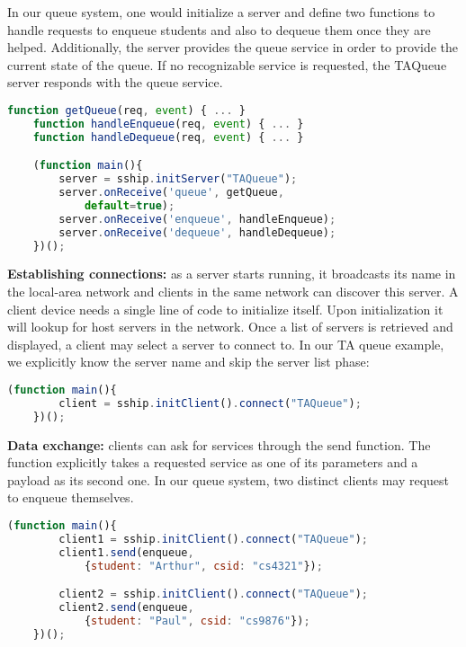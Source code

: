 In our queue system, one would initialize a server and define two functions to handle requests to enqueue students and also to dequeue them once they are helped. Additionally, the server provides the queue service in order to provide the current state of the queue. If no recognizable service is requested, the TAQueue server responds with the queue service.

\begin{lstlisting}[language=JavaScript]
    function getQueue(req, event) { ... }
    function handleEnqueue(req, event) { ... }
    function handleDequeue(req, event) { ... }

    (function main(){
        server = sship.initServer("TAQueue");
        server.onReceive('queue', getQueue, 
            default=true);
        server.onReceive('enqueue', handleEnqueue);
        server.onReceive('dequeue', handleDequeue);
    })();
\end{lstlisting}

{\bf Establishing connections: } as a server starts running, it broadcasts its name in the local-area network and clients in the same network can discover this server. A client device needs a single line of code to initialize itself. Upon initialization it will lookup for host servers in the network. Once a list of servers is retrieved and displayed, a client may select a server to connect to. In our TA queue example, we explicitly know the server name and skip the server list phase:

\begin{lstlisting}[language=JavaScript]
    (function main(){
        client = sship.initClient().connect("TAQueue");
    })();
\end{lstlisting}


{\bf Data exchange: } clients can ask for services through the {\ttfamily send} function. The function explicitly takes a requested service as one of its parameters and a payload as its second one. In our queue system, two distinct clients may request to enqueue themselves.

\begin{lstlisting}[language=JavaScript]
    (function main(){
        client1 = sship.initClient().connect("TAQueue");
        client1.send(enqueue, 
            {student: "Arthur", csid: "cs4321"});

        client2 = sship.initClient().connect("TAQueue");
        client2.send(enqueue, 
            {student: "Paul", csid: "cs9876"});
    })();
\end{lstlisting}


